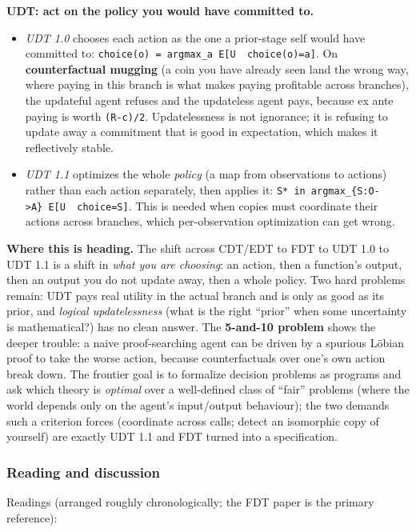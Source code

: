 \documentclass[11pt]{article}
\begin{document}
\textbf{UDT: act on the policy you would have committed to.}

\begin{itemize}
\item
  \emph{UDT 1.0} chooses each action as the one a prior-stage self would have committed to: \texttt{choice(o)\ =\ argmax\_a\ E{[}U\ \textbar{}\ choice(o)=a{]}}. On \textbf{counterfactual mugging} (a coin you have already seen land the wrong way, where paying in this branch is what makes paying profitable across branches), the updateful agent refuses and the updateless agent pays, because ex ante paying is worth \texttt{(R-c)/2}. Updatelessness is not ignorance; it is refusing to update away a commitment that is good in expectation, which makes it reflectively stable.
\item
  \emph{UDT 1.1} optimizes the whole \emph{policy} (a map from observations to actions) rather than each action separately, then applies it: \texttt{S*\ in\ argmax\_\{S:O-\textgreater{}A\}\ E{[}U\ \textbar{}\ choice=S{]}}. This is needed when copies must coordinate their actions across branches, which per-observation optimization can get wrong.
\end{itemize}

\textbf{Where this is heading.} The shift across CDT/EDT to FDT to UDT 1.0 to UDT 1.1 is a shift in \emph{what you are choosing}: an action, then a function's output, then an output you do not update away, then a whole policy. Two hard problems remain: UDT pays real utility in the actual branch and is only as good as its prior, and \emph{logical updatelessness} (what is the right ``prior'' when some uncertainty is mathematical?) has no clean answer. The \textbf{5-and-10 problem} shows the deeper trouble: a naive proof-searching agent can be driven by a spurious Löbian proof to take the worse action, because counterfactuals over one's own action break down. The frontier goal is to formalize decision problems as programs and ask which theory is \emph{optimal} over a well-defined class of ``fair'' problems (where the world depends only on the agent's input/output behaviour); the two demands such a criterion forces (coordinate across calls; detect an isomorphic copy of yourself) are exactly UDT 1.1 and FDT turned into a specification.

\subsubsection{Reading and discussion}
Readings (arranged roughly chronologically; the FDT paper is the primary reference):
\end{document}
